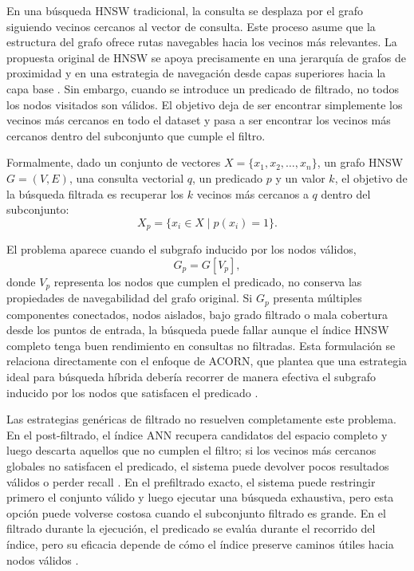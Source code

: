 En una búsqueda HNSW tradicional, la consulta se desplaza por el grafo siguiendo vecinos cercanos al vector de consulta. Este proceso asume que la estructura del grafo ofrece rutas navegables hacia los vecinos más relevantes. La propuesta original de HNSW se apoya precisamente en una jerarquía de grafos de proximidad y en una estrategia de navegación desde capas superiores hacia la capa base \parencite{malkov2020efficient,patel2024acorn}. Sin embargo, cuando se introduce un predicado de filtrado, no todos los nodos visitados son válidos. El objetivo deja de ser encontrar simplemente los vecinos más cercanos en todo el dataset y pasa a ser encontrar los vecinos más cercanos dentro del subconjunto que cumple el filtro.

Formalmente, dado un conjunto de vectores \(X = \{x_1, x_2, \ldots, x_n\}\), un grafo HNSW \(G=(V,E)\), una consulta vectorial \(q\), un predicado \(p\) y un valor \(k\), el objetivo de la búsqueda filtrada es recuperar los \(k\) vecinos más cercanos a \(q\) dentro del subconjunto:
\[
X_p = \{x_i \in X \mid p(x_i) = 1\}.
\]

El problema aparece cuando el subgrafo inducido por los nodos válidos,
\[
G_p = G[V_p],
\]
donde \(V_p\) representa los nodos que cumplen el predicado, no conserva las propiedades de navegabilidad del grafo original. Si \(G_p\) presenta múltiples componentes conectados, nodos aislados, bajo grado filtrado o mala cobertura desde los puntos de entrada, la búsqueda puede fallar aunque el índice HNSW completo tenga buen rendimiento en consultas no filtradas. Esta formulación se relaciona directamente con el enfoque de ACORN, que plantea que una estrategia ideal para búsqueda híbrida debería recorrer de manera efectiva el subgrafo inducido por los nodos que satisfacen el predicado \parencite{patel2024acorn}.

Las estrategias genéricas de filtrado no resuelven completamente este problema. En el post-filtrado, el índice ANN recupera candidatos del espacio completo y luego descarta aquellos que no cumplen el filtro; si los vecinos más cercanos globales no satisfacen el predicado, el sistema puede devolver pocos resultados válidos o perder recall \parencite{patel2024acorn,amanbayev2026filtered}. En el prefiltrado exacto, el sistema puede restringir primero el conjunto válido y luego ejecutar una búsqueda exhaustiva, pero esta opción puede volverse costosa cuando el subconjunto filtrado es grande. En el filtrado durante la ejecución, el predicado se evalúa durante el recorrido del índice, pero su eficacia depende de cómo el índice preserve caminos útiles hacia nodos válidos \parencite{amanbayev2026filtered}.

